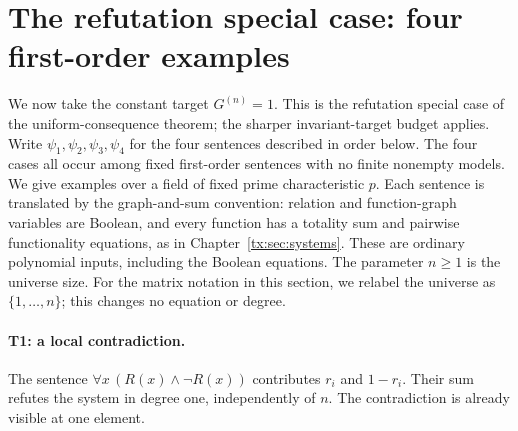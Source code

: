 \documentclass[11pt,a4paper,oneside,openany]{book}
\theoremstyle{definition}\newtheorem{definition}[theorem]{Definition}
\theoremstyle{remark}\newtheorem{remark}[theorem]{Remark}
\numberwithin{equation}{chapter}
\begin{document}
\section{The refutation special case: four first-order examples}
\label{tx:sec:examples}

We now take the constant target $G^{(n)}=1$. This is the refutation special
case of the uniform-consequence theorem; the sharper invariant-target
budget applies. Write $\psi_1,\psi_2,\psi_3,\psi_4$ for the four sentences described in order below.
The four cases all occur among fixed first-order sentences with no finite
nonempty models. We give examples over a field of fixed prime characteristic
$p$. Each sentence is translated by the graph-and-sum convention: relation
and function-graph variables are Boolean, and every function has a totality
sum and pairwise functionality equations, as in
Chapter~\ref{tx:sec:systems}. These are ordinary polynomial inputs,
including the Boolean equations. The parameter $n\geq1$ is the
universe size. For the matrix notation in this section, we relabel the
universe as $\{1,\ldots,n\}$; this changes no equation or degree.

\paragraph{T1: a local contradiction.}
The sentence $\forall x\,(R(x)\wedge\neg R(x))$ contributes $r_i$ and
$1-r_i$. Their sum refutes the system in degree one, independently of $n$.
The contradiction is already visible at one element.
\end{document}
